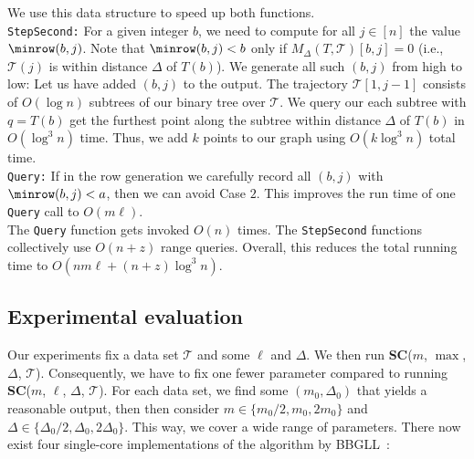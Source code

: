 \documentclass[english, thm-restate]{lipics-v2021}
\begin{document}
\noindent     
We use this data structure to speed up both functions.  \\
    
    

    

    \texttt{StepSecond:} 
    For a given integer $b$, we need to compute for all $j \in [n]$ the value $\minrow(b, j)$. 
    Note that $\minrow(b, j) < b$ only if $M_\Delta(T, \mathcal{T})[b, j] = 0$ (i.e., $\mathcal{T}(j)$ is within distance $\Delta$ of $T(b)$).   
    We generate all such $(b, j)$ from high to low: 
    Let us have added $(b, j)$ to the output. 
    The trajectory $\mathcal{T}[1, j - 1]$ consists of $O(\log n)$ subtrees of our binary tree over $\mathcal{T}$. We query our each subtree with $q = T(b)$ get the furthest point along the subtree  within distance $\Delta$ of $T(b)$ in $O(\log^3 n)$ time. Thus, we add $k$ points to our graph using $O(k \log^3 n)$ total time.  \\

    \texttt{Query:} 
    If in the row generation we carefully record all $(b, j)$ with $\minrow(b, j) < a$, then we can avoid Case $2$. This improves the run time of one \texttt{Query} call to $O(m \ell)$. \\
    

\noindent   
    The \texttt{Query} function gets invoked $O(n)$ times. The \texttt{StepSecond} functions collectively use $O(n + z)$ range queries. 
    Overall, this reduces the total running time to $O( n m \ell + (n+z) \log^3 n)$.
    
    

    
    \subsection{Experimental evaluation}
    \label{sub:comparison} 
    
    
    
Our experiments fix a data set $\mathcal{T}$ and some $\ell$ and $\Delta$. 
We then run \textbf{SC}($m$, $\max$, $\Delta$, $\mathcal{T}$).
Consequently, we have to fix one fewer parameter compared to running \textbf{SC}($m$, $\ell$, $\Delta$, $\mathcal{T}$). 
For each data set, we find some $(m_0, \Delta_0)$ that yields a reasonable output, then then consider $m \in \{m_0/2, m_0, 2 m_0\}$ and $\Delta \in \{\Delta_0/2, \Delta_0, 2 \Delta_0\}$.
This way, we cover a wide range of parameters.
There now exist four single-core implementations of the algorithm by BBGLL~\cite{buchin2011detecting}:
\end{document}
